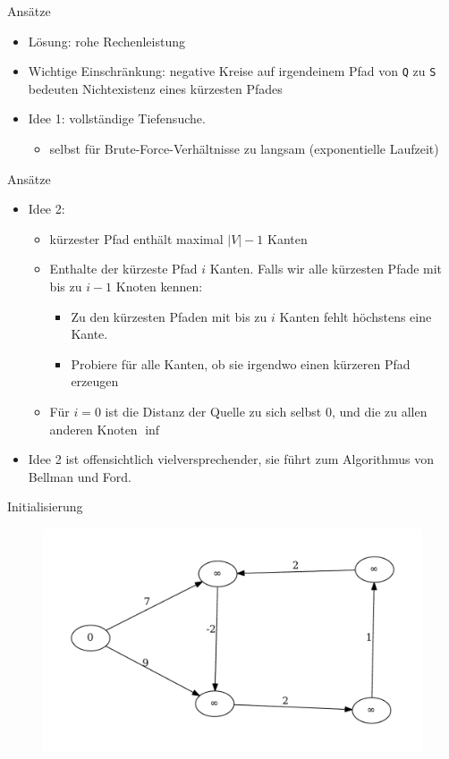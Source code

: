 \begin{frame}{Ansätze}
\begin{itemize}
\item
  Lösung: rohe %
  Rechenleistung
\item
  Wichtige Einschränkung: negative Kreise auf irgendeinem Pfad von
  \texttt{Q} zu \texttt{S} bedeuten Nichtexistenz eines kürzesten Pfades
\item
  Idee 1: vollständige Tiefensuche.

  \begin{itemize}
  \item
    selbst für Brute-Force-Verhältnisse zu langsam (exponentielle
    Laufzeit)
  \end{itemize}
\end{itemize}
\end{frame}
\begin{frame}{Ansätze}
\begin{itemize}
\item
  Idee 2:
  \begin{itemize}
  \item
    kürzester Pfad enthält maximal $|V| - 1$ Kanten
  \item
    Enthalte der kürzeste Pfad $i$ Kanten. Falls wir alle kürzesten
    Pfade mit bis zu $i - 1$ Knoten kennen:

    \begin{itemize}
    \item
      Zu den kürzesten Pfaden mit bis zu $i$ Kanten fehlt höchstens eine
      Kante.
    \item
      Probiere für alle Kanten, ob sie irgendwo einen kürzeren Pfad
      erzeugen
    \end{itemize}
  \item
    Für $i = 0$ ist die Distanz der Quelle zu sich selbst 0, und die zu
    allen anderen Knoten $\inf$
  \end{itemize}
\item
  Idee 2 ist offensichtlich vielversprechender, sie führt zum
  Algorithmus von Bellman und Ford.
\end{itemize}
\end{frame}

\begin{frame}{Initialisierung}
\begin{figure}[htbp]
\centering
\includegraphics[width=\linewidth]{bellman_ford_graphs/graph_00.pdf}
\end{figure}
\end{frame}

